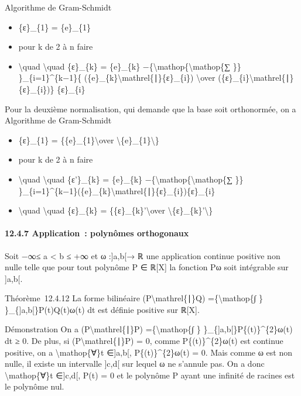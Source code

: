 \documentclass[]{article}
\begin{document}
Algorithme de Gram-Schmidt

\begin{itemize}
\itemsep1pt\parskip0pt
\item
  \{ε\}\_\{1\} = \{e\}\_\{1\}
\item
  pour k de 2 à n faire
\item
  \textbackslash{}quad \textbackslash{}quad \{ε\}\_\{k\} = \{e\}\_\{k\}
  −\{\textbackslash{}mathop\{\textbackslash{}mathop\{∑ \}\}
  \}\_\{i=1\}\^{}\{k−1\}\{
  (\{e\}\_\{k\}\textbackslash{}mathrel\{∣\}\{ε\}\_\{i\})
  \textbackslash{}over
  (\{ε\}\_\{i\}\textbackslash{}mathrel\{∣\}\{ε\}\_\{i\})\} \{ε\}\_\{i\}
\end{itemize}

Pour la deuxième normalisation, qui demande que la base soit
orthonormée, on a Algorithme de Gram-Schmidt

\begin{itemize}
\itemsep1pt\parskip0pt
\item
  \{ε\}\_\{1\} = \{\{e\}\_\{1\}\textbackslash{}over
  \textbackslash{}\textbar{}\{e\}\_\{1\}\textbackslash{}\textbar{}\}
\item
  pour k de 2 à n faire
\item
  \textbackslash{}quad \textbackslash{}quad \{ε'\}\_\{k\} = \{e\}\_\{k\}
  −\{\textbackslash{}mathop\{\textbackslash{}mathop\{∑ \}\}
  \}\_\{i=1\}\^{}\{k−1\}(\{e\}\_\{k\}\textbackslash{}mathrel\{∣\}\{ε\}\_\{i\})\{ε\}\_\{i\}
\item
  \textbackslash{}quad \textbackslash{}quad \{ε\}\_\{k\} =
  \{\{ε\}\_\{k\}'\textbackslash{}over
  \textbackslash{}\textbar{}\{ε\}\_\{k\}'\textbackslash{}\textbar{}\}
\end{itemize}

\paragraph{12.4.7 Application~: polynômes orthogonaux}

Soit −∞≤ a \textless{} b ≤ +∞ et ω :{]}a,b{[}→ ℝ une application
continue positive non nulle telle que pour tout polynôme P ∈ ℝ{[}X{]} la
fonction Pω soit intégrable sur {]}a,b{[}.

Théorème~12.4.12 La forme bilinéaire (P\textbackslash{}mathrel\{∣\}Q)
=\{\textbackslash{}mathop\{∫ \} \}\_\{{]}a,b{[}\}P(t)Q(t)ω(t) dt est
définie positive sur ℝ{[}X{]}.

Démonstration On a (P\textbackslash{}mathrel\{∣\}P)
=\{\textbackslash{}mathop\{∫ \} \}\_\{{]}a,b{[}\}P\{(t)\}\^{}\{2\}ω(t)
dt ≥ 0. De plus, si (P\textbackslash{}mathrel\{∣\}P) = 0, comme
P\{(t)\}\^{}\{2\}ω(t) est continue positive, on a
\textbackslash{}mathop\{∀\}t ∈{]}a,b{[}, P\{(t)\}\^{}\{2\}ω(t) = 0. Mais
comme ω est non nulle, il existe un intervalle {]}c,d{[} sur lequel ω ne
s'annule pas. On a donc \textbackslash{}mathop\{∀\}t ∈{]}c,d{[}, P(t) =
0 et le polynôme P ayant une infinité de racines est le polynôme nul.
\end{document}
